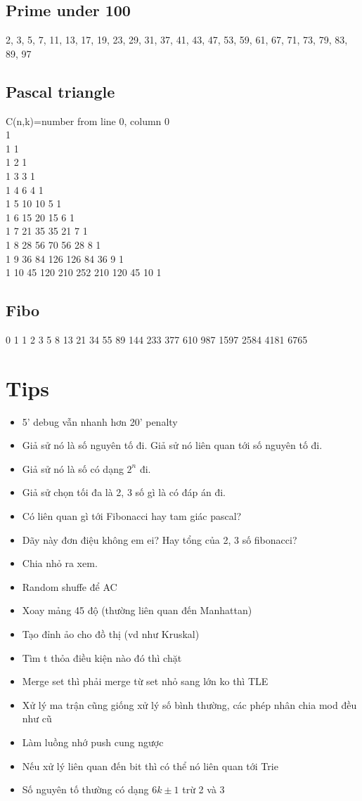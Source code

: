 \documentclass[A4 paper, 12pt, oneside, landscape]{article}
\begin{document}
\begin{multicols}{2}
	\subsection{Prime under 100}
	2, 3, 5, 7, 11, 13, 17, 19, 23, 29, 31, 37, 41, 43, 47, 53, 59, 61, 67, 71, 73, 79, 83, 89, 97 
	
	\subsection{Pascal triangle}
C(n,k)=number from line 0, column 0\\
1\\
1 1\\
1 2 1\\ 
1 3 3 1\\ 
1 4 6 4 1\\ 
1 5 10 10 5 1\\ 
1 6 15 20 15 6 1\\ 
1 7 21 35 35 21 7 1\\
1 8 28 56 70 56 28 8 1\\ 
1 9 36 84 126 126 84 36 9 1\\
1 10 45 120 210 252 210 120 45 10 1
	\subsection{Fibo}
	0 1 1 2 3 5 8 13 21 34 55 89 144 233 377 610 987 1597 2584 4181 6765
	\section{Tips}
	\begin{itemize}[topsep=0pt, partopsep=0pt, itemsep=0pt]
	\item 5' debug vẫn nhanh hơn 20' penalty
	\item Giả sử nó là số nguyên tố đi. Giả sử nó liên quan tới số nguyên tố đi.
	\item Giả sử nó là số có dạng $2^n$ đi.
	\item Giả sử chọn tối đa là 2, 3 số gì là có đáp án đi.
	\item Có liên quan gì tới Fibonacci hay tam giác pascal?
	\item Dãy này đơn điệu không em ei? Hay tổng của 2, 3 số fibonacci?
	\item Chia nhỏ ra xem.
	\item Random shuffe để AC
	\item Xoay mảng 45 độ (thường liên quan đến Manhattan)
	\item Tạo đỉnh ảo cho đồ thị (vd như Kruskal)
	\item Tìm t thỏa điều kiện nào đó thì chặt
	\item Merge set thì phải merge từ set nhỏ sang lớn ko thì TLE
	\item Xử lý ma trận cũng giống xử lý số bình thường, các phép nhân chia mod đều như cũ
	\item Làm luồng nhớ push cung ngược
	\item Nếu xử lý liên quan đến bit thì có thể nó liên quan tới Trie
	\item Số nguyên tố thường có dạng $6k \pm 1$ trừ 2 và 3
	\end{itemize}


\end{multicols}
\end{document}
